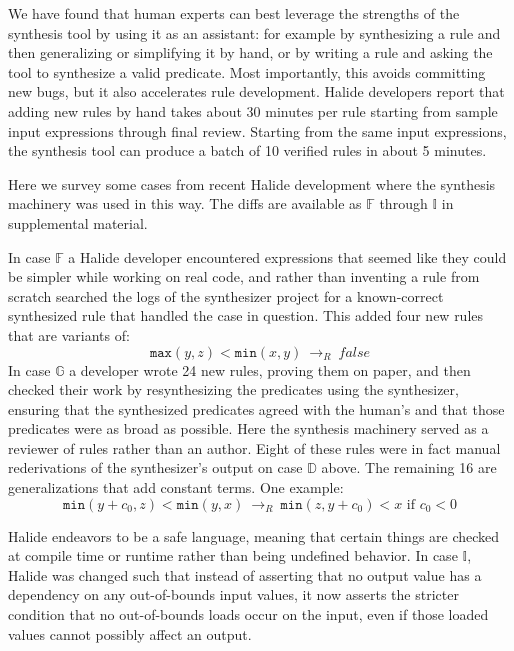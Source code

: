 \documentclass[acmsmall,review]{acmart}\settopmatter{printfolios=true,printccs=false,printacmref=false}
\newcommand{\hmax}[0]{\texttt{max}}
\newcommand{\hmin}[0]{\texttt{min}}
\newcommand{\rewrites}[0]{\:\rightarrow_{R}\:}
\newcommand{\pred}[0]{\textrm{ if }}
\begin{document}

We have found that human experts can best leverage the strengths of the synthesis tool by using it as an assistant: for example by synthesizing a rule and then generalizing or simplifying it by hand, or by writing a rule and asking the tool to synthesize a valid predicate. Most importantly, this avoids committing new bugs, but it also accelerates rule development. Halide developers report that adding new rules by hand takes about 30 minutes per rule starting from sample input expressions through final review. Starting from the same input expressions, the synthesis tool can produce a batch of 10 verified rules in about 5 minutes.

Here we survey some cases from recent Halide development where the synthesis machinery was used in this way. The diffs are available as $\mathbb{F}$ through $\mathbb{I}$ in supplemental material. 

In case $\mathbb{F}$ a Halide developer encountered expressions that seemed like they could be simpler while working on real code, and rather than inventing a rule from scratch searched the logs of the synthesizer project for a known-correct synthesized rule that handled the case in question. This added four new rules that are variants of:
\[
\hmax(y, z) < \hmin(x, y) \rewrites \mathit{false}
\]
In case $\mathbb{G}$ a developer wrote 24 new rules, proving them on paper, and then checked their work by resynthesizing the predicates using the synthesizer, ensuring that the synthesized predicates agreed with the human’s and that those predicates were as broad as possible. Here the synthesis machinery served as a reviewer of rules rather than an author. Eight of these rules were in fact manual rederivations of the synthesizer’s output on case $\mathbb{D}$ above. The remaining 16 are generalizations that add constant terms. One example:
\[
\hmin(y + c_0, z) < \hmin(y, x) \rewrites \hmin(z, y + c_0) < x \pred c_0 < 0
\]

Halide endeavors to be a safe language, meaning that certain things are checked at compile time or runtime rather than being undefined behavior. In case $\mathbb{I}$, Halide was changed such that instead of asserting that no output value has a dependency on any out-of-bounds input values, it now asserts the stricter condition that no out-of-bounds loads occur on the input, even if those loaded values cannot possibly affect an output.
\end{document}
